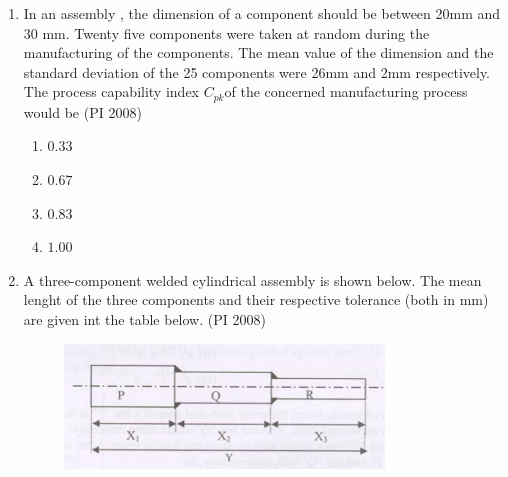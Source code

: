 \documentclass[journal,12pt,onecolumn]{IEEEtran}
\theoremstyle{remark}
\begin{document}
\begin{enumerate}
\begin{multicols}{4}
\begin{enumerate}
        \item $700^{\circ}C$
        \item $625^{\circ}C$
        \item $550^{\circ}C$
        \item $400^{\circ}C$
    \end{enumerate}
\end{multicols}
\vspace{1cm}
 \item %
 In an assembly , the dimension of a component should be between 20mm and 30 mm. Twenty five components were taken at random during the manufacturing of the components. The mean value of the dimension and the standard deviation of the 25 components were 26mm and 2mm respectively. The process capability index $C_{pk}$of the concerned manufacturing process 
 would be 
    \hfill{(PI 2008)}
    \begin{multicols}{4}
    \begin{enumerate}
        \item $0.33$
        \item $0.67$
        \item $0.83$
        \item $1.00$
    \end{enumerate}
\end{multicols}
\vspace{1cm}
 \item %
 A three-component welded cylindrical assembly is shown below. The mean lenght of the three components and their respective tolerance (both in mm) are given int the table below. 
    \hfill{(PI 2008)}
 
   \begin{figure}[h]
       \centering
       \includegraphics[width=0.5\linewidth]{figures/gate-pi-2008-40.png}
       \label{fig:q40}
   \end{figure}
   

\end{enumerate}
\end{document}
